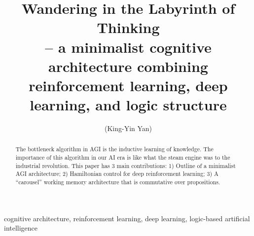 \documentclass[orivec]{llncs}
\title{Wandering in the Labyrinth of Thinking\\
\normalsize{-- a minimalist cognitive architecture combining\\
reinforcement learning, deep learning, and logic structure}}
\author{\usebox{\MyName} (King-Yin Yan)
}
\institute{General.Intelligence@Gmail.com}
\begin{document}
\maketitle

\setlength{\parindent}{0em}
\setlength{\parskip}{2.8ex plus0.8ex minus0.8ex}

\begin{abstract}
The bottleneck algorithm in AGI is the inductive learning of knowledge.  The importance of this algorithm in our AI era is like what the steam engine was to the industrial revolution.  This paper has 3 main contributions:  1) Outline of a minimalist AGI architecture; 2) Hamiltonian control for deep reinforcement learning; 3) A ``carousel'' working memory architecture that is commutative over propositions.
\end{abstract}

\begin{keywords}
cognitive architecture, reinforcement learning, deep learning, logic-based artificial intelligence
\end{keywords}

\end{document}
